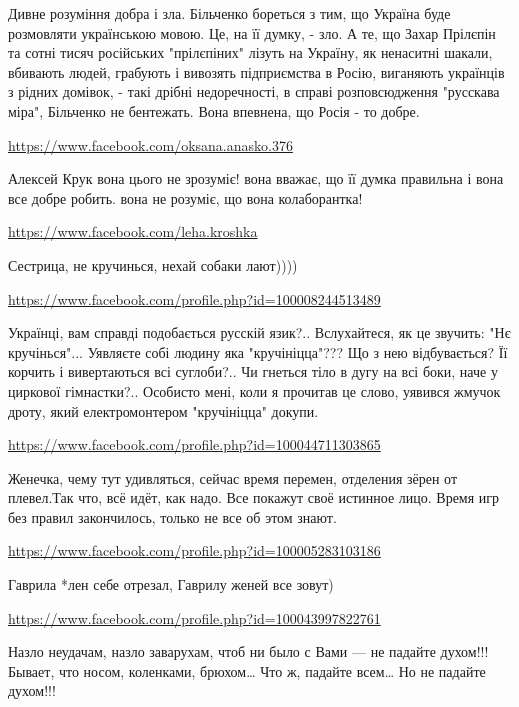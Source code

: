 \documentclass[a4paper,11pt]{extreport}
\begin{document}
\begin{itemize}
Дивне розуміння добра і зла.
Більченко бореться з тим, що Україна буде розмовляти українською мовою. Це, на її думку, - зло.
А те, що Захар Прілєпін та сотні тисяч російських "прілєпіних" лізуть на Україну, як ненаситні шакали, вбивають людей, грабують і вивозять підприємства в Росію, виганяють українців з рідних домівок, - такі дрібні недоречності, в справі розповсюдження "русскава міра", Більченко не бентежать. Вона впевнена, що Росія - то добре.

\begin{itemize}
\url{https://www.facebook.com/oksana.anasko.376}

Алексей Крук вона цього не зрозуміє! вона вважає, що її думка правильна і вона все добре робить. вона не розуміє, що вона колаборантка!

\end{itemize}
\url{https://www.facebook.com/leha.kroshka}

Сестрица, не кручинься, нехай собаки лают))))

\begin{itemize}
\url{https://www.facebook.com/profile.php?id=100008244513489}

Українці, вам справді подобається русскій язик?..
Вслухайтеся, як це звучить: "Нє кручінься"...
Уявляєте собі людину яка "кручініцца"??? Що з нею відбувається? Її корчить і вивертаються всі суглоби?.. Чи гнеться тіло в дугу на всі боки, наче у циркової гімнастки?..
Особисто мені, коли я прочитав це слово, уявився жмучок дроту, який електромонтером "кручініцца" докупи.

\end{itemize}
\url{https://www.facebook.com/profile.php?id=100044711303865}

Женечка, чему тут удивляться, сейчас время перемен, отделения зёрен от плевел.Так что, всё идёт, как надо. Все покажут своё истинное лицо. Время игр без правил закончилось, только не все об этом знают.

\url{https://www.facebook.com/profile.php?id=100005283103186}

Гаврила *лен себе отрезал, Гаврилу женей все зовут)

\url{https://www.facebook.com/profile.php?id=100043997822761}

Назло неудачам, назло заварухам,
чтоб ни было с Вами — не падайте духом!!!
Бывает, что носом, коленками, брюхом…
Что ж, падайте всем… Но не падайте духом!!!


\end{itemize}
\end{document}
